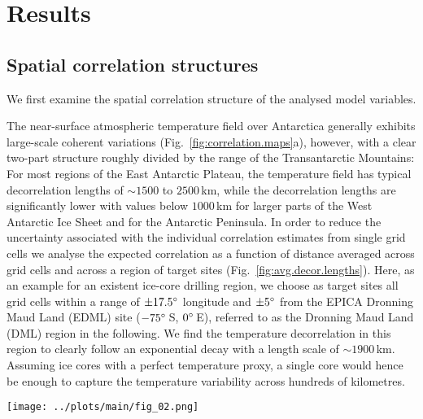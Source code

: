 \documentclass[cp, manuscript]{copernicus}
\begin{document}
\section{Results}\label{results}

\subsection{Spatial correlation structures}\label{results:cor.struct}

We first examine the spatial correlation structure of the analysed model
variables.

The near-surface atmospheric temperature field over Antarctica generally
exhibits large-scale coherent variations (Fig.~\ref{fig:correlation.maps}a),
however, with a clear two-part structure roughly divided by the range of the
Transantarctic Mountains: For most regions of the East Antarctic Plateau, the
temperature field has typical decorrelation lengths of $\sim1500$ to $2500$\,km,
while the decorrelation lengths are significantly lower with values below
$1000$\,km for larger parts of the West Antarctic Ice Sheet and for the
Antarctic Peninsula. In order to reduce the uncertainty associated with the
individual correlation estimates from single grid cells we analyse the expected
correlation as a function of distance averaged across grid cells and across a
region of target sites (Fig.~\ref{fig:avg.decor.lengths}). Here, as an example
for an existent ice-core drilling region, we choose as target sites all grid
cells within a range of $\pm17.5^{\circ}$ longitude and $\pm5^{\circ}$ from the
EPICA Dronning Maud Land (EDML) site ($-75^{\circ}$\,S, $0^{\circ}$\,E), referred
to as the Dronning Maud Land (DML) region in the following. We find the
temperature decorrelation in this region to clearly follow an exponential decay
with a length scale of $\sim1900$\,km. Assuming ice cores with a perfect
temperature proxy, a single core would hence be enough to capture the
temperature variability across hundreds of kilometres.

\begin{figure*}[t]%
\centering
\texttt{[image: ../plots/main/fig\_02.png]}
\caption{%
  Temperature decorrelation lengths and temperature--isotope
  relationship. (\textbf{a}) The temperature decorrelation lengths ($\tau$, in
  km) for each Antarctic model grid cell estimated by fitting an exponential
  model to the correlation--distance relationship obtained from correlating the
  local near-surface $T_{2\mathrm{m}}$ time series with the temperature time
  series from all other grid cells (Eq.~\ref{eq:decor.model}). Note that only
  continental grid cells are used for the fit. (\textbf{b}) The local
  correlation between the interannual near-surface temperature
  ($T_{2\mathrm{m}}$) and precipitation-weighted oxygen isotope composition
  ($\delta^{18}\mathrm{O}^{\mathrm{(pw)}}$) time series for each Antarctic model
  grid cell.}
\label{fig:correlation.maps}%
\end{figure*}%
\end{document}
